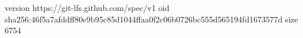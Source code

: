 version https://git-lfs.github.com/spec/v1
oid sha256:46f5a7afddff80e9b95c85d1044ffaa0f2c06b0726bc555d565194fd1673577d
size 6754
